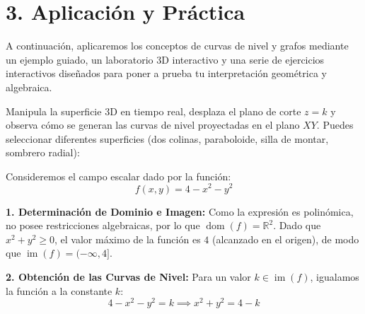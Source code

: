 \documentclass[11pt]{article}
\newenvironment{procesamiento}[1]{%
  \begin{tcolorbox}[colback=gray!5,colframe=gray!60!black,title=Procedimiento: #1]%
}{%
  \end{tcolorbox}%
}
\newenvironment{aplicacion}{%
  \section*{3. Aplicación y Práctica}%
}{}
\newenvironment{ejemplo}[1]{%
  \begin{tcolorbox}[colback=white,colframe=gray!40,title=Ejemplo: #1]%
}{%
  \end{tcolorbox}%
}
\begin{document}
\begin{aplicacion}
  A continuación, aplicaremos los conceptos de curvas de nivel y grafos mediante un ejemplo guiado, un laboratorio 3D interactivo y una serie de ejercicios interactivos diseñados para poner a prueba tu interpretación geométrica y algebraica.

  \begin{procesamiento}{Laboratorio 3D Interactivo: Planos de Corte y Curvas de Nivel}
    Manipula la superficie 3D en tiempo real, desplaza el plano de corte $z=k$ y observa cómo se generan las curvas de nivel proyectadas en el plano $XY$. Puedes seleccionar diferentes superficies (dos colinas, paraboloide, silla de montar, sombrero radial):
    
  \end{procesamiento}

  \begin{ejemplo}{Construcción de Curvas de Nivel para un Paraboloide}
    Consideremos el campo escalar dado por la función:
    $$ f(x,y) = 4 - x^2 - y^2 $$
    
    \textbf{1. Determinación de Dominio e Imagen:}
    Como la expresión es polinómica, no posee restricciones algebraicas, por lo que $\operatorname{dom}(f) = \mathbb{R}^2$. Dado que $x^2 + y^2 \geq 0$, el valor máximo de la función es $4$ (alcanzado en el origen), de modo que $\operatorname{im}(f) = (-\infty, 4]$.
    
    \textbf{2. Obtención de las Curvas de Nivel:}
    Para un valor $k \in \operatorname{im}(f)$, igualamos la función a la constante $k$:
    $$ 4 - x^2 - y^2 = k \implies x^2 + y^2 = 4 - k $$
    

\end{ejemplo}
\end{aplicacion}
\end{document}
